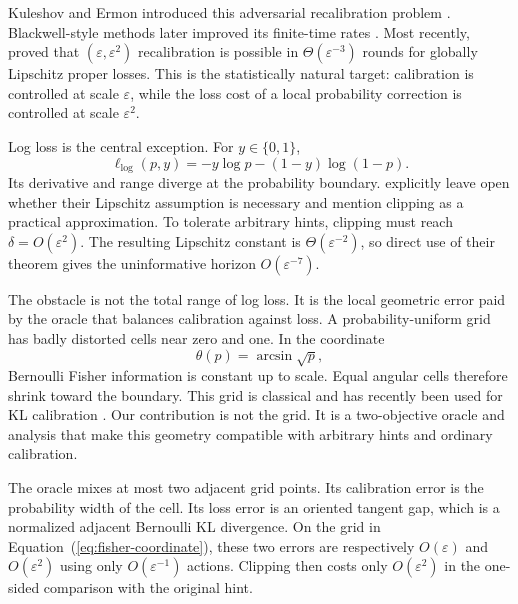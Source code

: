 \documentclass{article}
\begin{document}
Kuleshov and Ermon introduced this adversarial recalibration problem \citep{kuleshov2017estimating}. Blackwell-style methods later improved its finite-time rates \citep{okoroafor2024faster}. Most recently, \citet{hu2026optimal} proved that $(\varepsilon,\varepsilon^2)$ recalibration is possible in $\Theta(\varepsilon^{-3})$ rounds for globally Lipschitz proper losses. This is the statistically natural target: calibration is controlled at scale $\varepsilon$, while the loss cost of a local probability correction is controlled at scale $\varepsilon^2$.

Log loss is the central exception. For $y\in\{0,1\}$,
\begin{equation}
  \ell_{\log}(p,y)=-y\log p-(1-y)\log(1-p).
  \label{eq:logloss}
\end{equation}
Its derivative and range diverge at the probability boundary. \citet{hu2026optimal} explicitly leave open whether their Lipschitz assumption is necessary and mention clipping as a practical approximation. To tolerate arbitrary hints, clipping must reach $\delta=O(\varepsilon^2)$. The resulting Lipschitz constant is $\Theta(\varepsilon^{-2})$, so direct use of their theorem gives the uninformative horizon $O(\varepsilon^{-7})$.

The obstacle is not the total range of log loss. It is the local geometric error paid by the oracle that balances calibration against loss. A probability-uniform grid has badly distorted cells near zero and one. In the coordinate
\begin{equation}
  \theta(p)=\arcsin\sqrt p,
  \label{eq:fisher-coordinate}
\end{equation}
Bernoulli Fisher information is constant up to scale. Equal angular cells therefore shrink toward the boundary. This grid is classical \citep{derooij2009switching,kotlowski2016isotonic} and has recently been used for KL calibration \citep{luo2025kl,liu2026adaptive}. Our contribution is not the grid. It is a two-objective oracle and analysis that make this geometry compatible with arbitrary hints and ordinary calibration.

The oracle mixes at most two adjacent grid points. Its calibration error is the probability width of the cell. Its loss error is an oriented tangent gap, which is a normalized adjacent Bernoulli KL divergence. On the grid in Equation~(\ref{eq:fisher-coordinate}), these two errors are respectively $O(\varepsilon)$ and $O(\varepsilon^2)$ using only $O(\varepsilon^{-1})$ actions. Clipping then costs only $O(\varepsilon^2)$ in the one-sided comparison with the original hint.
\end{document}

